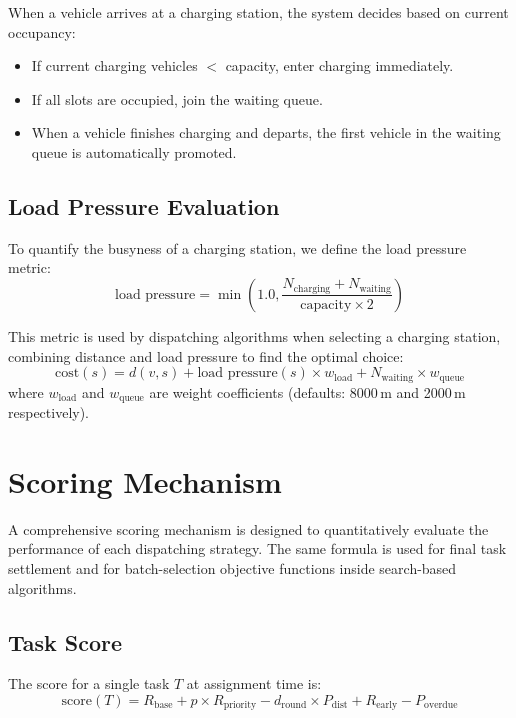 When a vehicle arrives at a charging station, the system decides based on current occupancy:
\begin{itemize}[leftmargin=4em]
    \item If current charging vehicles $<$ capacity, enter charging immediately.
    \item If all slots are occupied, join the waiting queue.
    \item When a vehicle finishes charging and departs, the first vehicle in the waiting queue is automatically promoted.
\end{itemize}

\subsection{Load Pressure Evaluation}

To quantify the busyness of a charging station, we define the load pressure metric:
\begin{equation}
    \text{load pressure} = \min\left(1.0, \frac{N_{\text{charging}} + N_{\text{waiting}}}{\text{capacity} \times 2}\right)
\end{equation}

This metric is used by dispatching algorithms when selecting a charging station, combining distance and load pressure to find the optimal choice:
\begin{equation}
    \text{cost}(s) = d(v, s) + \text{load pressure}(s) \times w_{\text{load}} + N_{\text{waiting}} \times w_{\text{queue}}
\end{equation}
where $w_{\text{load}}$ and $w_{\text{queue}}$ are weight coefficients (defaults: 8000\,m and 2000\,m respectively).

\section{Scoring Mechanism}

A comprehensive scoring mechanism is designed to quantitatively evaluate the performance of each dispatching strategy. The same formula is used for final task settlement and for batch-selection objective functions inside search-based algorithms.

\subsection{Task Score}

The score for a single task $T$ at assignment time is:
\begin{equation}
    \text{score}(T) = R_{\text{base}} + p \times R_{\text{priority}} - d_{\text{round}} \times P_{\text{dist}} + R_{\text{early}} - P_{\text{overdue}}
\end{equation}

